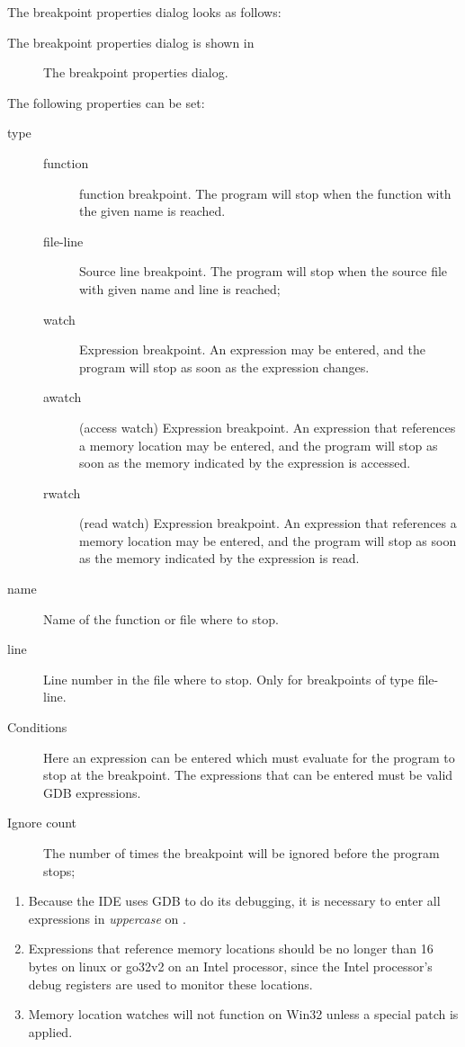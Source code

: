 \begin{htmlonly}
The breakpoint properties dialog looks as follows:
\end{htmlonly}
\begin{latexonly}
The breakpoint properties dialog is shown in 
\begin{figure}[ht]
\caption{The breakpoint properties dialog.}\label{fig:brkprop}
\ifpdf
{}
\else
{}
\fi
\end{figure}
\end{latexonly}
The following properties can be set:
\begin{description}
\item[type]
\begin{description}
\item[function] function breakpoint. The program will stop when the function
with the given name is reached.
\item[file-line] Source line breakpoint. The program will stop when the
source file with given name and line is reached;
\item[watch] Expression breakpoint. An expression may be entered, and the
program will stop as soon as the expression changes.
\item[awatch] (access watch) Expression breakpoint. An expression that references a 
memory location may be entered, and the program will stop as soon as 
the memory indicated by the expression is accessed.
\item[rwatch] (read watch) Expression breakpoint. An expression that references a
memory location may be entered, and the program will stop as soon as 
the memory indicated by the expression is read.
\end{description}
\item[name] Name of the function or file where to stop.
\item[line] Line number in the file where to stop. Only for breakpoints of
type file-line.
\item[Conditions] Here an expression can be entered which must evaluate 
 for the program to stop at the breakpoint. The expressions that
can be entered must be valid GDB expressions.
\item[Ignore count] The number of times the breakpoint will be ignored
before the program stops; 
\end{description}
\begin{remark}
\begin{enumerate}
\item Because the IDE uses GDB to do its debugging, it is necessary to enter all
expressions in {\em uppercase} on \freebsd. 
\item Expressions that reference memory locations should be no longer than 16 
bytes on linux or go32v2 on an Intel processor, since the Intel processor's 
debug registers are used to monitor these locations.
\item Memory location watches will not function on Win32 unless a special 
patch is applied. 
\end{enumerate}
\end{remark}

